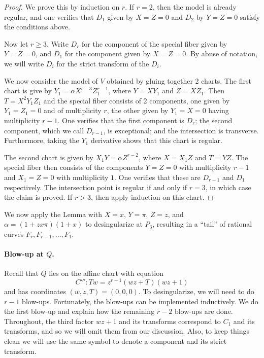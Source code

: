 \documentclass{article}
\theoremstyle{plain}
\theoremstyle{definition}
\theoremstyle{remark}
\begin{document}
\begin{proof}
  We prove this by induction on $r$. If $r = 2$, then the model is already regular, and one verifies that $D_1$ given by $X = Z = 0$ and $D_2$ by $Y = Z = 0$ satisfy the conditions above.

  Now let $r \geq 3$. Write $D_r$ for the component of the special fiber given by $Y = Z = 0$, and $D_1$ for the component given by $X = Z = 0$. By abuse of notation, we will write $D_i$ for the strict transform of the $D_i$.

  We now consider the model of $V$ obtained by gluing together 2 charts. The first chart is give by $Y_1 = \alpha X^{r-3}Z_1^{r-1}$, where $Y = XY_1$ and $Z = XZ_1$. Then $T = X^2 Y_1 Z_1$ and the special fiber consists of 2 components, one given by $Y_1 = Z_1 = 0$ and of multiplicity $r$, the other given by $Y_1 = X = 0$ having multiplicity $r-1$. One verifies that the first component is $D_r$; the second component, which we call $D_{r-1}$, is exceptional; and the intersection is transverse. Furthermore, taking the $Y_1$ derivative shows that this chart is regular.

  The second chart is given by $X_1 Y = \alpha Z^{r-2}$, where $X = X_1 Z$ and $T = YZ$. The special fiber then consists of the components $Y = Z = 0$ with multiplicity $r-1$ and $X_1 = Z = 0$ with multiplicity $1$. One verifies that these are $D_{r-1}$ and $D_1$ respectively. The intersection point is regular if and only if $r = 3$, in which case the claim is proved. If $r > 3$, then apply induction on this chart.
\end{proof}

We now apply the Lemma with $X = x$, $Y = \pi$, $Z = z$, and $\alpha = (1 + zx\pi)(1 + x)$ to desingularize at $P_3$, resulting in a ``tail'' of rational curves $F_r, F_{r-1}, \dots, F_1$.

\paragraph{Blow-up at $Q$.}
\label{sec:blow-up-Q}

Recall that $Q$ lies on the affine chart with equation
\begin{equation}
  C''':Tw = z^{r-1}(wz + T)(wz + 1)\label{eq:C'''}
\end{equation}
and has coordinates $(w,z,T) = (0,0,0)$. To desingularize, we will need to do $r-1$ blow-ups. Fortunately, the blow-ups can be implemented inductively. We do the first blow-up and explain how the remaining $r-2$ blow-ups are done. Throughout, the third factor $wz + 1$ and its transforms correspond to $C_1$ and its transforms, and so we will omit them from our discussion. Also, to keep things clean we will use the same symbol to denote a component and its strict transform.
\end{document}
